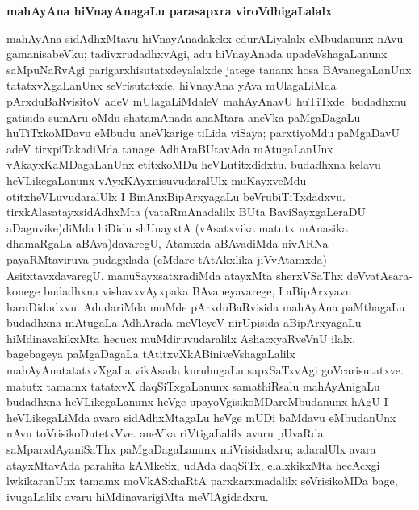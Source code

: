 \begin{center}
{\textbf{\Large mahAyAna hiVnayAnagaLu parasapxra viroVdhigaLalalx}}
\end{center}

mahAyAna sidAdhxMtavu hiVnayAnadakekx edurALiyalalx eMbudanunx nAvu gamanisabeVku; tadivxrudadhxvAgi, adu hiVnayAnada upadeVshagaLanunx saMpuNaRvAgi parigarxhisutatxdeyalalxde jatege tananx hosa BAvanegaLanUnx tatatxvXgaLanUnx seVrisutatxde. hiVnayAna yAva mUlagaLiMda pArxduBaRvisitoV adeV mUlagaLiMdaleV mahA\-yAnavU huTiTxde. budadhxnu gatisida sumAru oMdu shatamAnada anaMtara aneVka paMgaDa\-gaLu huTiTxkoMDavu eMbudu aneVkarige tiLida viSaya; parxtiyoMdu paMga\-DavU adeV tirxpiTakadiMda tanage AdhAraBUtavAda mAtugaLanUnx vAkayxKaMDa\-gaLanUnx  etitxkoMDu heVLutitxdidxtu. budadhxna kelavu heVLikegaLanunx vAyxKAyxnisuvudaralUlx muKayx\-veMdu otitxheVLuvudaralUlx I BinAnxBipArxyagaLu beVrubiTiTxdadxvu. tirxkAlasatayxsidAdhxMta (vataRmAnadalilx BUta BaviSayxgaLeraDU aDaguvike)diMda hiDidu shUnayxtA (vAsatxvika matutx mAnasika dhamaRgaLa aBAva)davaregU, Atamxda aBAvadiMda nivARNa payaRMta\-viruva pudagxlada (eMdare tAtAkxlika jiVvAtamxda) AsitxtavxdavaregU, manuSayx\-satxradiMda atayxMta sherxVSaThx deVvatAsara-konege budadhxna vishavxvAyxpaka BAvaneyavarege, I aBi\-pArxyavu haraDidadxvu. AdudariMda muMde pArxduBaRvisida mahAyAna paMthagaLu budadhxna mAtugaLa AdhArada meVleyeV nirUpisida aBipArxyagaLu hiMdinavakikxMta hecucx muMdiruvudaralilx AshacxyaR\-veVnU ilalx. bagebageya paMgaDagaLa tAtitxvXkABi\-niveVshagaLalilx mahAyAnatatatxvXgaLa vikAsada kuruhugaLu sapxSaTxvAgi goVcarisutatxve. matutx tamamx tatatxvX daqSiTx\-gaLanunx samathiRsalu mahAyAnigaLu budadhxna heVLikegaLanunx heVge upayoVgisikoMDareMbudanunx hAgU I heVLikegaLiMda avara sidAdhxMta\-gaLu heVge mUDi baMdavu eMbudanUnx nAvu toVrisi\-koDu\-tetxVve. aneVka riVtigaLalilx avaru pUvaRda saMparxdAyaniSaThx paMgaDagaLanunx miVrisidadxru; adaralUlx avara atayxMta\-vAda parahita kAMkeSx, udAda daqSiTx, elalxkikxMta hecAcxgi lwkikaranUnx tamamx moVkASx\-haRtA parxkarxmadalilx seVrisikoMDa bage, ivugaLalilx avaru hiMdinava\-rigiMta meVlAgi\-dadxru.

